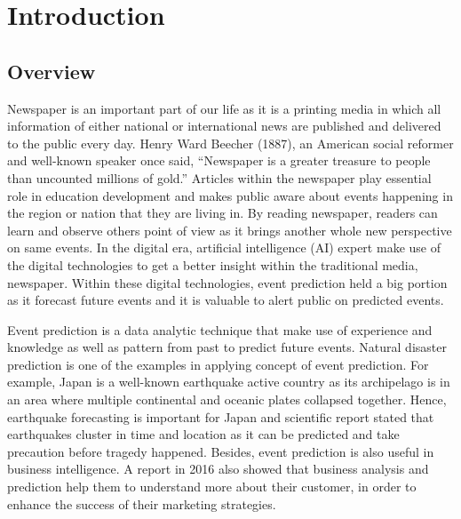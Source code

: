 \documentclass[twoside]{utmthesis}
\begin{document}



\listofappendices


\mainmatter


\chapter{Introduction}


\section{Overview}
Newspaper is an important part of our life as it is a printing media in which all information of either national or international news are published and delivered to the public every day. Henry Ward Beecher (1887), an American social reformer and well-known speaker once said, “Newspaper is a greater treasure to people than uncounted millions of gold.” Articles within the newspaper play essential role in education development and makes public aware about events happening in the region or nation that they are living in. By reading newspaper, readers can learn and observe others point of view as it brings another whole new perspective on same events. In the digital era, artificial intelligence (AI) expert make use of the digital technologies to get a better insight within the traditional media, newspaper.\cite{jamesbaker2019} Within these digital technologies, event prediction held a big portion as it forecast future events and it is valuable to alert public on predicted events. 

Event prediction is a data analytic technique that make use of experience and knowledge as well as pattern from past to predict future events. Natural disaster prediction is one of the examples in applying concept of event prediction. For example, Japan is a well-known earthquake active country as its archipelago is in an area where multiple continental and oceanic plates collapsed together. Hence, earthquake forecasting is important for Japan and scientific report \citep{jamesd.goltz2018} stated that earthquakes cluster in time and location as it can be predicted and take precaution before tragedy happened. Besides, event prediction is also useful in business intelligence. A report in 2016 also showed that business analysis and prediction help them to understand more about their customer, in order to enhance the success of their marketing strategies. \citep{erevelles2016big}
\end{document}
